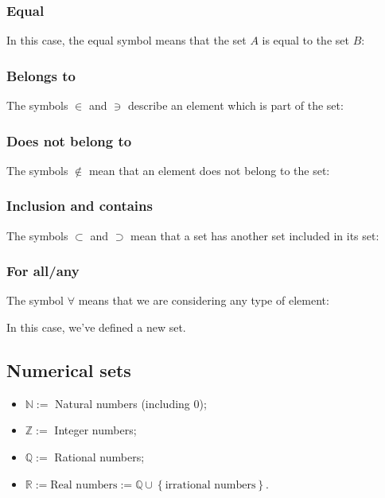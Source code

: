 \documentclass{article}
\begin{document}
\subsubsection{Equal}
In this case, the equal symbol means that the set $A$ is equal to the set $B$:

\subsubsection{Belongs to}
The symbols $\in$ and $\ni$ describe an element which is part of the set:

\subsubsection{Does not belong to}
The symbols $\notin$ mean that an element does not belong to the set:

\subsubsection{Inclusion and contains}
The symbols $\subset$ and $\supset$ mean that a set has another set included in its set:

\subsubsection{For all/any}
The symbol $\forall$ means that we are considering any type of element:

In this case, we've defined a new set.

\subsection{Numerical sets}
\begin{itemize}
    \item $\mathbb{N} :=$ Natural numbers (including 0);
    \item $\mathbb{Z} :=$ Integer numbers;
    \item $\mathbb{Q} :=$ Rational numbers;
    \item $\mathbb{R} := \text{Real numbers} := \mathbb{Q} \cup \left\{\text{irrational numbers}\right\}.$
\end{itemize}

\end{document}
